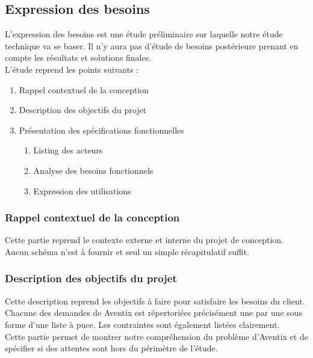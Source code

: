 \subsection{Expression des besoins}
L'expression des besoins est une étude préliminaire sur laquelle notre étude
technique va se baser. Il n'y aura pas d'étude de besoins postérieure prenant en
compte les résultats et solutions finales. \\

L'étude reprend les points suivants :
\begin{enumerate}
  \item Rappel contextuel de la conception
  \item Description des objectifs du projet
  \item Présentation des spécifications fonctionnelles
    \begin{enumerate}
      \item Listing des acteurs
      \item Analyse des besoins fonctionnels
      \item Expression des utilisations
    \end{enumerate}
\end{enumerate}

\subsubsection{Rappel contextuel de la conception}
Cette partie reprend le contexte externe et interne du projet de conception. \\

Aucun schéma n'est à fournir et seul un simple récapitulatif suffit. \\

\subsubsection{Description des objectifs du projet}
Cette description reprend les objectifs à faire pour satisfaire les besoins du
client. \\

Chacune des demandes de Aventix est répertoriées précisément une par une sous
forme d'une liste à puce. Les contraintes sont également listées clairement. \\

Cette partie permet de montrer notre compréhension du problème d'Aventix et de
spécifier si des attentes sont hors du périmètre de l'étude. \\

